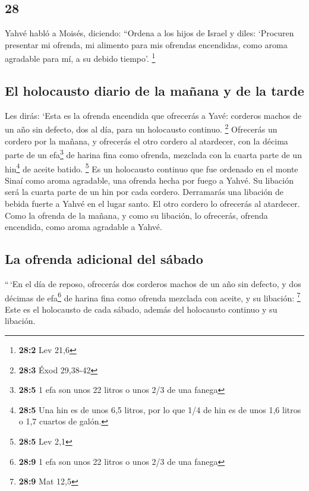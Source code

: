 \begin{paracol}{2}
\hypertarget{section-54}{%
\section{28}\label{section-54}}

 Yahvé habló a Moisés, diciendo:  ``Ordena a
los hijos de Israel y diles: `Procuren presentar mi ofrenda, mi alimento
para mis ofrendas encendidas, como aroma agradable para mí, a su debido
tiempo'. \footnote{\textbf{28:2} Lev 21,6}

\hypertarget{el-holocausto-diario-de-la-mauxf1ana-y-de-la-tarde}{%
\subsection{El holocausto diario de la mañana y de la
tarde}\label{el-holocausto-diario-de-la-mauxf1ana-y-de-la-tarde}}

 Les dirás: `Esta es la ofrenda encendida que ofrecerás a
Yavé: corderos machos de un año sin defecto, dos al día, para un
holocausto continuo. \footnote{\textbf{28:3} Éxod 29,38-42}
 Ofrecerás un cordero por la mañana, y ofrecerás el otro
cordero al atardecer,  con la décima parte de un
efa\footnote{\textbf{28:5} 1 efa son unos 22 litros o unos 2/3 de una
  fanega} de harina fina como ofrenda, mezclada con la cuarta parte de
un hin\footnote{\textbf{28:5} Una hin es de unos 6,5 litros, por lo que
  1/4 de hin es de unos 1,6 litros o 1,7 cuartos de galón.} de aceite
batido. \footnote{\textbf{28:5} Lev 2,1}  Es un holocausto
continuo que fue ordenado en el monte Sinaí como aroma agradable, una
ofrenda hecha por fuego a Yahvé.  Su libación será la
cuarta parte de un hin por cada cordero. Derramarás una libación de
bebida fuerte a Yahvé en el lugar santo.  El otro cordero
lo ofrecerás al atardecer. Como la ofrenda de la mañana, y como su
libación, lo ofrecerás, ofrenda encendida, como aroma agradable a Yahvé.

\hypertarget{la-ofrenda-adicional-del-suxe1bado}{%
\subsection{La ofrenda adicional del
sábado}\label{la-ofrenda-adicional-del-suxe1bado}}

 ``\,`En el día de reposo, ofrecerás dos corderos machos
de un año sin defecto, y dos décimas de efa\footnote{\textbf{28:9} 1 efa
  son unos 22 litros o unos 2/3 de una fanega} de harina fina como
ofrenda mezclada con aceite, y su libación: \footnote{\textbf{28:9} Mat
  12,5}  Este es el holocausto de cada sábado, además del
holocausto continuo y su libación.


\end{paracol}
